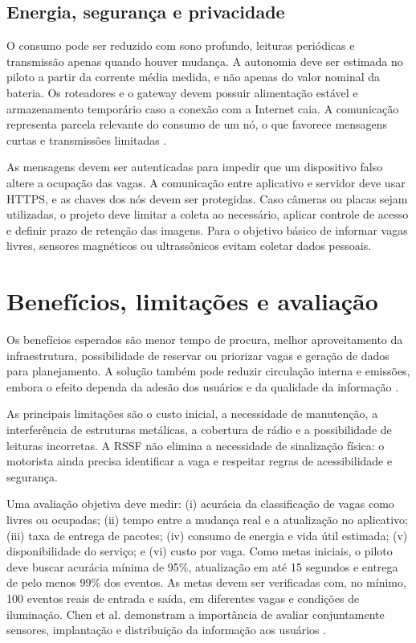 \documentclass[11pt,a4paper]{article}
\begin{document}
\subsection{Energia, segurança e privacidade}
O consumo pode ser reduzido com sono profundo, leituras periódicas e transmissão apenas quando houver mudança. A autonomia deve ser estimada no piloto a partir da corrente média medida, e não apenas do valor nominal da bateria. Os roteadores e o gateway devem possuir alimentação estável e armazenamento temporário caso a conexão com a Internet caia. A comunicação representa parcela relevante do consumo de um nó, o que favorece mensagens curtas e transmissões limitadas \cite{hilmani2018}.

As mensagens devem ser autenticadas para impedir que um dispositivo falso altere a ocupação das vagas. A comunicação entre aplicativo e servidor deve usar HTTPS, e as chaves dos nós devem ser protegidas. Caso câmeras ou placas sejam utilizadas, o projeto deve limitar a coleta ao necessário, aplicar controle de acesso e definir prazo de retenção das imagens. Para o objetivo básico de informar vagas livres, sensores magnéticos ou ultrassônicos evitam coletar dados pessoais.

\section{Benefícios, limitações e avaliação}
Os benefícios esperados são menor tempo de procura, melhor aproveitamento da infraestrutura, possibilidade de reservar ou priorizar vagas e geração de dados para planejamento. A solução também pode reduzir circulação interna e emissões, embora o efeito dependa da adesão dos usuários e da qualidade da informação \cite{chen2016,hilmani2018}.

As principais limitações são o custo inicial, a necessidade de manutenção, a interferência de estruturas metálicas, a cobertura de rádio e a possibilidade de leituras incorretas. A RSSF não elimina a necessidade de sinalização física: o motorista ainda precisa identificar a vaga e respeitar regras de acessibilidade e segurança.

Uma avaliação objetiva deve medir: (i) acurácia da classificação de vagas como livres ou ocupadas; (ii) tempo entre a mudança real e a atualização no aplicativo; (iii) taxa de entrega de pacotes; (iv) consumo de energia e vida útil estimada; (v) disponibilidade do serviço; e (vi) custo por vaga. Como metas iniciais, o piloto deve buscar acurácia mínima de 95\%, atualização em até 15 segundos e entrega de pelo menos 99\% dos eventos. As metas devem ser verificadas com, no mínimo, 100 eventos reais de entrada e saída, em diferentes vagas e condições de iluminação. Chen et al. demonstram a importância de avaliar conjuntamente sensores, implantação e distribuição da informação aos usuários \cite{chen2016}.
\end{document}
